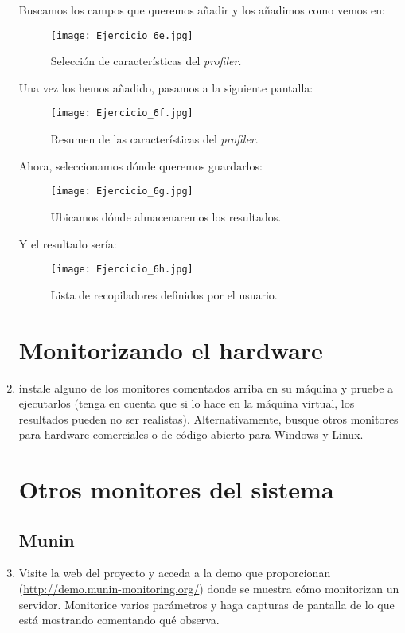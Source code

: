 \documentclass[paper=a4, fontsize=11pt]{scrartcl} %
\numberwithin{equation}{section} %
\numberwithin{figure}{section} %
\numberwithin{table}{section} %
\begin{document}
\begin{enumerate}
		Buscamos los campos que queremos añadir y los añadimos como vemos en:
		
		\begin{figure}[H]
			\texttt{[image: Ejercicio\_6e.jpg]}
			\caption{Selección de características del \textit{profiler}.}
			\label{fig:SP_configure}
		\end{figure}
		
		Una vez los hemos añadido, pasamos a la siguiente pantalla:
		
		\begin{figure}[H]
			\centering
			\texttt{[image: Ejercicio\_6f.jpg]}
			\caption{Resumen de las características del \textit{profiler}.}
			\label{fig:SP_summary}
		\end{figure}
		
		Ahora, seleccionamos dónde queremos guardarlos:
		 
		\begin{figure}[H]
			\centering
			\texttt{[image: Ejercicio\_6g.jpg]}
			\caption{Ubicamos dónde almacenaremos los resultados.}
			\label{fig:SP_save}
		\end{figure}
		
		Y el resultado sería:
		
		\begin{figure}[H]
			\centering
			\texttt{[image: Ejercicio\_6h.jpg]}
			\caption{Lista de recopiladores definidos por el usuario.}
			\label{fig:SP_all}
		\end{figure}
		
	\section{Monitorizando el hardware}
		\item instale alguno de los monitores comentados arriba en su máquina y pruebe a ejecutarlos
		(tenga en cuenta que si lo hace en la máquina virtual, los resultados pueden no ser
		realistas). Alternativamente, busque otros monitores para hardware comerciales o de código
		abierto para Windows y Linux.
		
	\section{Otros monitores del sistema}
	\subsection{Munin}
		\item Visite la web del proyecto y acceda a la demo que proporcionan
		(\url{http://demo.munin-monitoring.org/}) donde se muestra cómo monitorizan un servidor.
		Monitorice varios parámetros y haga capturas de pantalla de lo que está mostrando comentando
		qué observa.
		

\end{enumerate}
\end{document}
